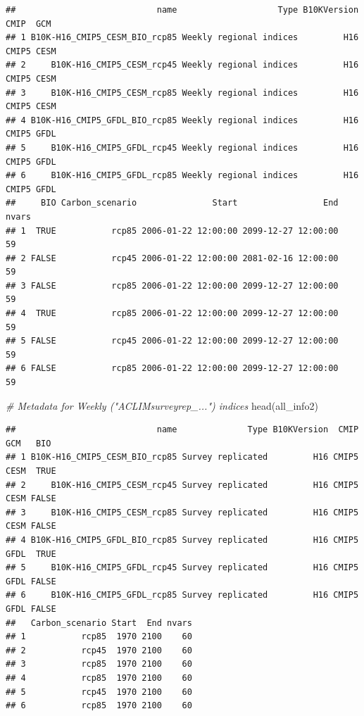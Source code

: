 \documentclass[
]{article}
\newenvironment{Shaded}{\begin{snugshade}}{\end{snugshade}}
\newcommand{\CommentTok}[1]{\textcolor[rgb]{0.56,0.35,0.01}{\textit{#1}}}
\newcommand{\FunctionTok}[1]{\textcolor[rgb]{0.00,0.00,0.00}{#1}}
\newcommand{\NormalTok}[1]{#1}
\begin{document}
\begin{verbatim}
##                            name                    Type B10KVersion  CMIP  GCM
## 1 B10K-H16_CMIP5_CESM_BIO_rcp85 Weekly regional indices         H16 CMIP5 CESM
## 2     B10K-H16_CMIP5_CESM_rcp45 Weekly regional indices         H16 CMIP5 CESM
## 3     B10K-H16_CMIP5_CESM_rcp85 Weekly regional indices         H16 CMIP5 CESM
## 4 B10K-H16_CMIP5_GFDL_BIO_rcp85 Weekly regional indices         H16 CMIP5 GFDL
## 5     B10K-H16_CMIP5_GFDL_rcp45 Weekly regional indices         H16 CMIP5 GFDL
## 6     B10K-H16_CMIP5_GFDL_rcp85 Weekly regional indices         H16 CMIP5 GFDL
##     BIO Carbon_scenario               Start                 End nvars
## 1  TRUE           rcp85 2006-01-22 12:00:00 2099-12-27 12:00:00    59
## 2 FALSE           rcp45 2006-01-22 12:00:00 2081-02-16 12:00:00    59
## 3 FALSE           rcp85 2006-01-22 12:00:00 2099-12-27 12:00:00    59
## 4  TRUE           rcp85 2006-01-22 12:00:00 2099-12-27 12:00:00    59
## 5 FALSE           rcp45 2006-01-22 12:00:00 2099-12-27 12:00:00    59
## 6 FALSE           rcp85 2006-01-22 12:00:00 2099-12-27 12:00:00    59
\end{verbatim}

\begin{Shaded}
\begin{Highlighting}[]
    \CommentTok{\# Metadata for Weekly ("ACLIMsurveyrep\_...") indices}
    \FunctionTok{head}\NormalTok{(all\_info2)}
\end{Highlighting}
\end{Shaded}

\begin{verbatim}
##                            name              Type B10KVersion  CMIP  GCM   BIO
## 1 B10K-H16_CMIP5_CESM_BIO_rcp85 Survey replicated         H16 CMIP5 CESM  TRUE
## 2     B10K-H16_CMIP5_CESM_rcp45 Survey replicated         H16 CMIP5 CESM FALSE
## 3     B10K-H16_CMIP5_CESM_rcp85 Survey replicated         H16 CMIP5 CESM FALSE
## 4 B10K-H16_CMIP5_GFDL_BIO_rcp85 Survey replicated         H16 CMIP5 GFDL  TRUE
## 5     B10K-H16_CMIP5_GFDL_rcp45 Survey replicated         H16 CMIP5 GFDL FALSE
## 6     B10K-H16_CMIP5_GFDL_rcp85 Survey replicated         H16 CMIP5 GFDL FALSE
##   Carbon_scenario Start  End nvars
## 1           rcp85  1970 2100    60
## 2           rcp45  1970 2100    60
## 3           rcp85  1970 2100    60
## 4           rcp85  1970 2100    60
## 5           rcp45  1970 2100    60
## 6           rcp85  1970 2100    60
\end{verbatim}
\end{document}

